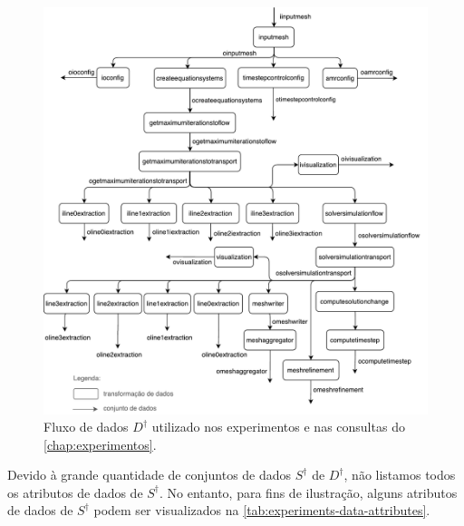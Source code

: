 \begin{figure}[!htb]
    \centering
    \includegraphics[width=\textwidth]{img/experiments-dataflow}
    \caption[Fluxo de dados $D^{\dagger}$ utilizado nos experimentos]{Fluxo de dados $D^{\dagger}$ utilizado nos experimentos e nas consultas do \autoref{chap:experimentos}.}%
    \label{fig:experiments-dataflow}
\end{figure}

Devido à grande quantidade de conjuntos de dados \(S^{\dagger}\) de \(D^{\dagger}\), não listamos todos os atributos de dados de \(S^{\dagger}\). No entanto, para fins de ilustração, alguns atributos de dados de \(S^{\dagger}\) podem ser visualizados na \autoref{tab:experiments-data-attributes}.

